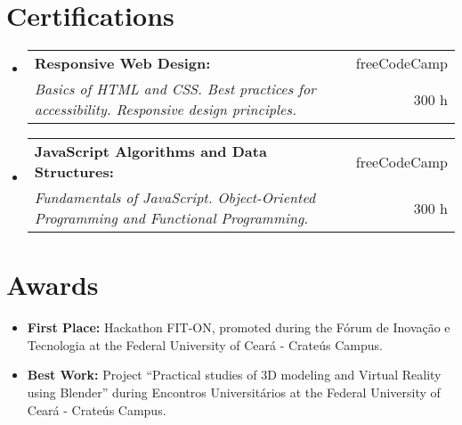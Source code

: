 \documentclass[letterpaper,11pt]{article}
\makeatletter
\newcommand{\resumeItem}[2]{
    \item \small{\textbf{#1}{ #2 \vspace{-2pt}}}
}
\newcommand{\resumeCertifications}[4]{
    \vspace{-1pt}\item
        \begin{tabular*}{0.97\textwidth}{l@{\extracolsep{\fill}}r}
            \textbf{\small#1} & #2 \\
            \textit{\small#3} & \small #4 \\
        \end{tabular*}\vspace{-5pt}
    \vspace{0.1cm}
}
\newcommand{\resumeSubItem}[2]{\resumeItem{#1}{#2}\vspace{-4pt}}
\newcommand{\resumeSubHeadingListStart}{\begin{itemize}[leftmargin=*]}
\newcommand{\resumeSubHeadingListEnd}{\end{itemize}}
\makeatother
\begin{document}
\section{\faCertificate \hspace{0.2cm} \Large Certifications}

    \resumeSubHeadingListStart
        \resumeCertifications
            {Responsive Web Design:}{{\small \faInstitution} \hspace{0.01cm} freeCodeCamp}
            {Basics of HTML and CSS. Best practices for accessibility. Responsive design principles. \href{https://www.freecodecamp.org/certification/danielbrito/responsive-web-design}{\scriptsize \faExternalLink}}{\faClockO \hspace{0.1cm} 300 h}
            
        \resumeCertifications
            {JavaScript Algorithms and Data Structures:}{{\small \faInstitution} \hspace{0.01cm} freeCodeCamp}
            {Fundamentals of JavaScript. Object-Oriented Programming and Functional Programming. \href{https://www.freecodecamp.org/certification/danielbrito/javascript-algorithms-and-data-structures}{\scriptsize \faExternalLink}}{\faClockO \hspace{0.1cm} 300 h}
            
            \vspace{0.1cm} %
    \resumeSubHeadingListEnd

\section{\faTrophy \hspace{0.2cm} \Large Awards}
    \resumeSubHeadingListStart
        \resumeSubItem{First Place:}
        {Hackathon FIT-ON, promoted during the Fórum de Inovação e Tecnologia at the Federal University of Ceará - Crateús Campus.}
        
        \vspace{0.2cm}
        
        \resumeSubItem{Best Work:}
        {Project ``Practical studies of 3D modeling and Virtual Reality using Blender'' during Encontros Universitários at the Federal University of Ceará - Crateús Campus.}
        
        \vspace{0.3cm}
    \resumeSubHeadingListEnd
\end{document}
